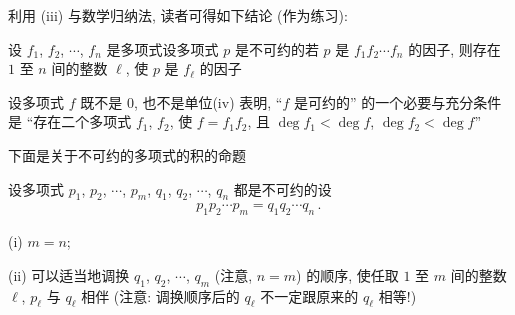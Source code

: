 \begin{remark}
    利用 (iii) 与数学归纳法, 读者可得如下结论 (作为练习):

    设 $f_1$, $f_2$, $\cdots$, $f_n$ 是多项式\period 设多项式 $p$ 是不可约的\period 若 $p$ 是 $f_1 f_2 \cdots f_n$ 的因子, 则存在 $1$ 至 $n$ 间的整数 $\ell$, 使 $p$ 是 $f_{\ell}$ 的因子\period
\end{remark}

\begin{remark}
    设多项式 $f$ 既不是 $0$, 也不是单位\period (iv) 表明, ``$f$ 是可约的'' 的一个必要与充分条件是 ``存在二个多项式 $f_1$, $f_2$, 使 $f = f_1 f_2$, 且 $\deg f_1 < \deg f$, $\deg f_2 < \deg f$''\period
\end{remark}

下面是关于不可约的多项式的积的命题\period

\begin{proposition}
    设多项式 $p_1$, $p_2$, $\cdots$, $p_m$, $q_1$, $q_2$, $\cdots$, $q_n$ 都是不可约的\period 设
    \begin{align*}
        p_1 p_2 \cdots p_m = q_1 q_2 \cdots q_n \period
    \end{align*}

    (i) $m = n$;

    (ii) 可以适当地调换 $q_1$, $q_2$, $\cdots$, $q_m$ (注意, $n = m$) 的顺序, 使任取 $1$ 至 $m$ 间的整数 $\ell$, $p_{\ell}$ 与 $q_{\ell}$ 相伴 (注意: 调换顺序后的 $q_{\ell}$ 不一定跟原来的 $q_{\ell}$ 相等!)\period
\end{proposition}

